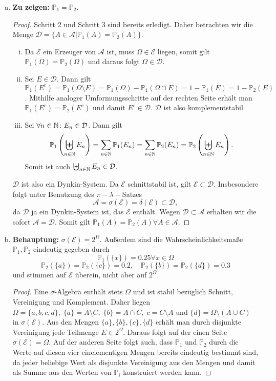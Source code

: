 \documentclass[uebung]{lecture}
\newcommand{\A}{\mathcal{A}}
\newcommand{\D}{\mathcal{D}}
\newcommand{\E}{\mathcal{E}}
\newcommand{\IP}{\mathbb{P}}
\begin{document}
\begin{aufgabe}
    \begin{enumerate}[(a)]
        \item \textbf{Zu zeigen:} $\IP_1 = \IP_2$.
        \begin{proof}
        Schritt 2 und Schritt 3 sind bereits erledigt. Daher betrachten wir die Menge $\D = \{A\in \A| \IP_1(A) = \IP_2(A)\}$.
        \begin{enumerate}[(i)]
            \item Da $\E$ ein Erzeuger von $\A$ ist, muss $\Omega \in \E$ liegen, somit gilt $\IP_1(\Omega) = \IP_2(\Omega)$ und daraus folgt $\Omega \in \D$. 
            \item Sei $E \in \D$. Dann gilt $\IP_1(E^c) = \IP_1(\Omega \setminus E) = \IP_1(\Omega) - \IP_1(\Omega \cap E) = 1 - \IP_1(E) = 1 - \IP_2(E)$. Mithilfe analoger Umformungsschritte auf der rechten Seite erhält man $\IP_1(E^c) = \IP_2(E^c)$ und damit $E^c \in \D$. $\D$ ist also komplementstabil
            \item Sei $\forall n \in \N\colon E_n \in \D$. Dann gilt 
            \[
                \IP_1\left(\biguplus_{n\in \N} E_n\right) = \sum_{n \in \N} \IP_1(E_n) = \sum_{n \in \N} \IP_2(E_n) = \IP_2\left(\biguplus_{n\in \N} E_n\right).
                \]
                Somit ist auch $\biguplus_{n\in \N}E_n \in \D$.
            \end{enumerate}
            $\D$ ist also ein Dynkin-System. Da $\E$ schnittstabil ist, gilt $\E \subset \D$. Insbesondere folgt unter Benutzung des $\pi-\lambda-$Satzes \[\A = \sigma(\E) = \delta(\E) \subset \D,\] da $\D$ ja ein Dynkin-System ist, das $\E$ enthält. Wegen $\D \subset \A$ erhalten wir die sofort $\A = \D$. Somit gilt $\IP_1(A) = \IP_2(A) \forall A \in \A$.
        \end{proof}
        \item \textbf{Behauptung:} $\sigma(\E) = 2^\Omega$. Außerdem sind die Wahrscheinlichkeitsmaße $\IP_1,\IP_2$ eindeutig gegeben durch
        \[
            \IP_1(\{x\}) = 0.25 \forall x \in \Omega
        \]
        \[
            \IP_2(\{a\}) = \IP_2(\{c\}) = 0.2,\quad \IP_2(\{b\}) = \IP_2(\{d\}) = 0.3
        \] und stimmen auf $\E$ überein, nicht aber auf $2^\Omega$.
        \begin{proof}
            Eine $\sigma$-Algebra enthält stets $\Omega$ und ist stabil bezüglich Schnitt, Vereinigung und Komplement. Daher liegen $\Omega = \{a,b,c,d\},\; \{a\} = A \setminus C,\; \{b\} = A\cap C,\; c = C \setminus A$ und $\{d\} = \Omega \setminus (A \cup C)$  in $\sigma(\E)$. Aus den Mengen $\{a\}, \{b\},\{c\},\{d\}$ erhält man durch disjunkte Vereinigung jede Teilmenge $E \in 2^\Omega$. Daraus folgt auf der einen Seite $\sigma(\E) = \Omega$. Auf der anderen Seite folgt auch, dass $\IP_1$ und $\IP_2$ durch die Werte auf diesen vier einelementigen Mengen bereits eindeutig bestimmt sind, da jeder beliebige Wert als disjunkte Vereinigung aus den Mengen und damit als Summe aus den Werten von $\IP_i$ konstruiert werden kann.

\end{proof}
\end{enumerate}
\end{aufgabe}
\end{document}
